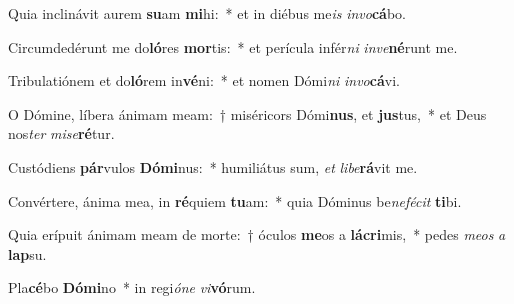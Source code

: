 \item Quia inclinávit aurem \textbf{su}am \textbf{mi}hi:~* et in diébus me\textit{is} \textit{in}\textit{vo}\textbf{cá}bo.
\item Circumdedérunt me do\textbf{ló}res \textbf{mor}tis:~* et perícula infér\textit{ni} \textit{in}\textit{ve}\textbf{né}runt me.
\item Tribulatiónem et do\textbf{ló}rem in\textbf{vé}ni:~* et nomen Dómi\textit{ni} \textit{in}\textit{vo}\textbf{cá}vi.
\item O Dómine, líbera ánimam meam:~† miséricors Dómi\textbf{nus}, et \textbf{jus}tus,~* et Deus nos\textit{ter} \textit{mi}\textit{se}\textbf{ré}tur.
\item Custódiens \textbf{pár}vulos \textbf{Dó}\textbf{mi}nus:~* humiliátus sum, \textit{et} \textit{li}\textit{be}\textbf{rá}vit me.
\item Convértere, ánima mea, in \textbf{ré}quiem \textbf{tu}am:~* quia Dóminus be\textit{ne}\textit{fé}\textit{cit} \textbf{ti}bi.
\item Quia erípuit ánimam meam de morte:~† óculos \textbf{me}os a \textbf{lá}\textbf{cri}mis,~* pedes \textit{me}\textit{os} \textit{a} \textbf{lap}su.
\item Pla\textbf{cé}bo \textbf{Dó}\textbf{mi}no~* in regi\textit{ó}\textit{ne} \textit{vi}\textbf{vó}rum.
